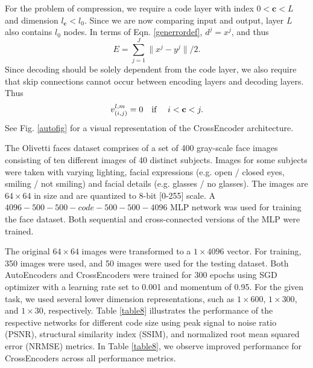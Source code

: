 \documentclass{jcmlatex}
\begin{document}
For the problem of compression, we require a code layer with index $0<\mathbf c<L$ and dimension $l_\mathbf c < l_0$. Since we are now comparing input and output, layer $L$ also contains $l_0$ nodes. In terms of Eqn.  \ref{generrordef}, $d^j = x^j$, and thus
\begin{equation}
E = \sum_{j = 1}^J \|x^j-y^j\|/2.
\end{equation}
Since decoding should be solely dependent  from the code layer, we also require that skip connections cannot occur between encoding layers and decoding layers.  Thus
 \begin{equation}
 v_{(i,j)}^{l,m} = 0 \quad \hbox{if }  \quad i<\mathbf c < j. \label{encoderequire}
 \end{equation}
 See Fig. \ref{autofig} for a visual representation of the CrossEncoder architecture.

The Olivetti faces dataset \cite{minear2004lifespan} comprises of a set of 400 gray-scale face images consisting of ten different images of 40 distinct subjects. Images for some subjects were taken with varying lighting, facial expressions (e.g. open / closed eyes, smiling / not smiling) and facial details (e.g. glasses / no glasses). %
The images are $64\times64$ in size and are quantized to 8-bit [0-255] scale. A $4096-500-500-code-500-500-4096$ MLP network was used for training the face dataset. Both sequential and cross-connected versions of the MLP were trained.

The original $64\times64$ images were transformed to a $1\times4096$ vector. For training, 350 images were used, and 50 images were used for the testing dataset. Both AutoEncoders and CrossEncoders were trained for 300 epochs using SGD optimizer with a learning rate set to 0.001 and momentum of 0.95. For the given task, we used several lower dimension representations, such as $1\times600$, $1\times300$, and $1\times30$, respectively. Table \ref{table8} illustrates the performance of the respective networks for different code size using peak signal to noise ratio (PSNR), structural similarity index (SSIM), and normalized root mean squared error (NRMSE) metrics. In Table \ref{table8}, we observe improved performance for CrossEncoders across all performance metrics.
\end{document}
